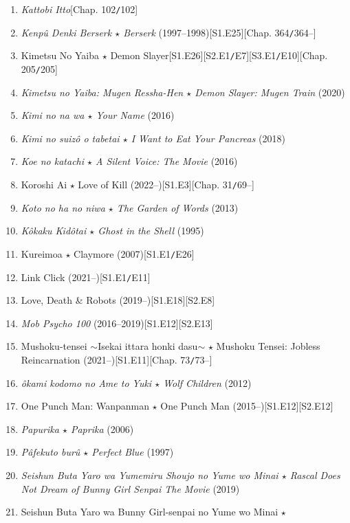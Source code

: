 \documentclass{article}
\begin{document}
\begin{enumerate}
    Kaguya-sama: Love is War (2019--)\hfill[S1.E12][S2.E12][S3.E1--]
    \item \textit{Kattobi Itto}\hfill[Chap. 102\texttt{/}102]
    \item \textit{Kenp\^u Denki Berserk $\star$ Berserk} (1997--1998)\hfill[S1.E25][Chap. 364\texttt{/}364--]
    \item Kimetsu No Yaiba $\star$ Demon Slayer\hfill[S1.E26][S2.E1\texttt{/}E7][S3.E1\texttt{/}E10][Chap. 205\texttt{/}205]
    \item \textit{Kimetsu no Yaiba: Mugen Ressha-Hen $\star$ Demon Slayer: Mugen Train} (2020)
    \item \textit{Kimi no na wa $\star$ Your Name} (2016)
    \item \textit{Kimi no suiz\^o o tabetai $\star$ I Want to Eat Your Pancreas} (2018)
    \item \textit{Koe no katachi $\star$ A Silent Voice: The Movie} (2016)
    \item Koroshi Ai $\star$ Love of Kill (2022--)\hfill[S1.E3][Chap. 31\texttt{/}69--]
    \item \textit{Koto no ha no niwa $\star$ The Garden of Words} (2013)
    \item \textit{K\^okaku Kid\^otai $\star$ Ghost in the Shell} (1995)
    \item Kureimoa $\star$ Claymore (2007)\hfill[S1.E1\texttt{/}E26]
    \item Link Click (2021--)\hfill[S1.E1\texttt{/}E11]
    \item Love, Death \& Robots (2019--)\hfill[S1.E18][S2.E8]
    \item \textit{Mob Psycho 100} (2016--2019)\hfill[S1.E12][S2.E13]
    \item Mushoku-tensei $\sim$Isekai ittara honki dasu$\sim$ $\star$ Mushoku Tensei: Jobless Reincarnation (2021--)\hfill[S1.E11][Chap. 73\texttt{/}73--]
    \item \textit{\^okami kodomo no Ame to Yuki $\star$ Wolf Children} (2012)
    \item One Punch Man: Wanpanman $\star$ One Punch Man (2015--)\hfill[S1.E12][S2.E12]
    \item \textit{Papurika $\star$ Paprika} (2006)
    \item \textit{Pâfekuto burû $\star$ Perfect Blue} (1997)
    \item \textit{Seishun Buta Yaro wa Yumemiru Shoujo no Yume wo Minai $\star$ Rascal Does Not Dream of Bunny Girl Senpai The Movie} (2019)
    \item Seishun Buta Yaro wa Bunny Girl-senpai no Yume wo Minai $\star$
    

\end{enumerate}
\end{document}
